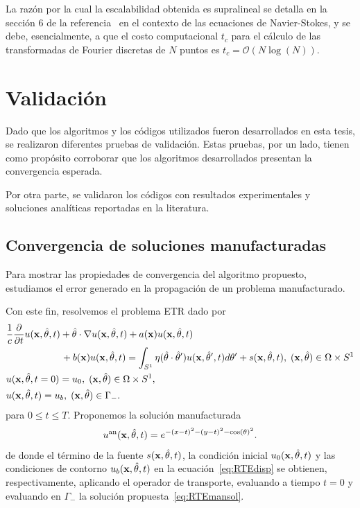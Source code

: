 La razón por la cual la escalabilidad obtenida es supralineal se detalla 
en la sección 6 de la referencia~\cite{Albin2011} en el contexto de las ecuaciones de 
Navier-Stokes, y se debe, esencialmente, a que el costo 
computacional $t_c$ para el cálculo de las transformadas de Fourier discretas de $N$ puntos es $t_c=\mathcal{O}(N\log(N))$.

\section{Validación}

Dado que los algoritmos y los códigos utilizados fueron desarrollados en 
esta tesis, se realizaron diferentes pruebas de validación. Estas pruebas, 
por un lado, tienen como propósito corroborar que los algoritmos 
desarrollados presentan la convergencia esperada. 

Por otra parte, se validaron los códigos con resultados experimentales 
y soluciones analíticas reportadas en la literatura.

\subsection{Convergencia de soluciones manufacturadas}
\label{sec:manufacturada}

Para mostrar las propiedades de convergencia del algoritmo propuesto,
estudiamos el error generado en la propagación de un problema manufacturado.

Con este fin, resolvemos el problema ETR dado por 
\begin{equation*}
\begin{split}
\begin{aligned}
&\frac{1}{c}\frac{\partial }{\partial t}u(\mathbf{x},\hat{\theta},t) + \hat{\theta} \cdot \nabla u(\mathbf{x},\hat{\theta},t)+a(\mathbf{x})u(\mathbf{x},\hat{\theta},t)  \\
&\quad \quad \quad  \quad \quad \; \;\,  +b(\mathbf{x})u(\mathbf{x},\hat{\theta},t) = \int_{S^1}\eta(\hat{\theta}\cdot\hat{\theta} ') 
u(\mathbf{x},\hat \theta',t) d\theta'+s(\mathbf{x},\hat{\theta},t),  \; (\mathbf{x},\hat{\theta})  \in \Omega\times S^1\\
&u(\mathbf{x},\hat{\theta},t=0)=u_0, \; (\mathbf{x},\hat{\theta})  \in \Omega\times S^1,  \\
&u(\mathbf{x},\hat{\theta},t)=u_b, \; (\mathbf{x},\hat{\theta}) \in \Gamma_-. \notag
\end{aligned}
\end{split}
\label{eq:RTEdisp}
\end{equation*}
para $0\leq t \leq T$. Proponemos la solución manufacturada
\begin{equation*}
u^{\text{an}}(\mathbf{x},\hat{\theta},t)=e^{-(x-t)^2-(y-t)^2-\cos(\theta)^2}.
\label{eq:RTEmansol}
\end{equation*}
de donde el término de la fuente $s(\mathbf{x},\hat{\theta},t)$, 
la condición inicial $u_0(\mathbf{x},\hat{\theta},t)$ y las condiciones 
de contorno $u_b(\mathbf{x},\hat{\theta},t)$ en la ecuación~\eqref{eq:RTEdisp} 
se obtienen, respectivamente, aplicando el operador de transporte, 
evaluando a tiempo $t=0$ y evaluando en $\Gamma_-$ la solución 
propuesta~\eqref{eq:RTEmansol}.

